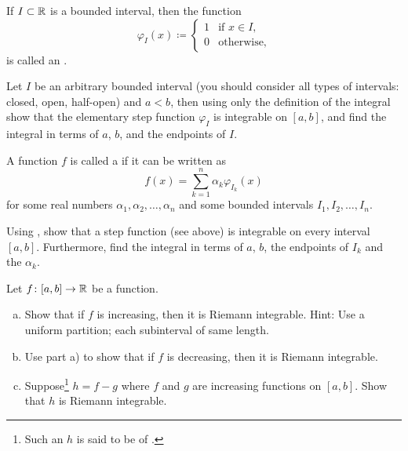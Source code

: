 \begin{exnote}
If $I \subset {\mathbb{R}}$ is a bounded interval, then
the function
\begin{equation*}
\varphi_I(x) \coloneqq
\begin{cases}
1 & \text{if } x \in I, \\
0 & \text{otherwise,}
\end{cases}
\end{equation*}
is called an \emph{}.
\end{exnote}

\begin{exercise} \label{exercise:stepfunctionintegrable}
Let $I$ be an arbitrary bounded interval (you should consider all types
of intervals: closed, open, half-open) and $a < b$, then
using only the definition of the integral
show that
the elementary step function $\varphi_I$ is integrable
on $[a,b]$, and find the integral in terms of $a$, $b$, and the
endpoints of $I$.
\end{exercise}

\begin{exnote}
A function $f$ is called a
\emph{} if it
can be written as
\begin{equation*}
f(x) = \sum_{k=1}^n \alpha_k \varphi_{I_k} (x)
\end{equation*}
for some real numbers $\alpha_1,\alpha_2, \ldots, \alpha_n$
and some bounded intervals $I_1,I_2,\ldots,I_n$.
\end{exnote}

\begin{exercise}
Using , show that a step
function (see above) is integrable
on every interval $[a,b]$.  Furthermore, find the integral in terms of
$a$, $b$, the endpoints of $I_k$ and the $\alpha_k$.
\end{exercise}

\begin{exercise}
\label{exercise:boundedvariationintegrable}
Let $f \colon [a,b] \to {\mathbb{R}}$ be a function.
\begin{enumerate}[a)]
\item
Show that if $f$ is increasing, then it is Riemann
integrable.  Hint: Use a uniform partition; each subinterval of same length.
\item
Use part a) to show that if $f$ is decreasing, then it is Riemann
integrable.
\item
Suppose\footnote{Such an $h$ is said to be of \emph{}.}
$h = f-g$ where $f$ and $g$ are increasing
functions on $[a,b]$.  Show that $h$ is Riemann integrable.
\end{enumerate}
\end{exercise}

